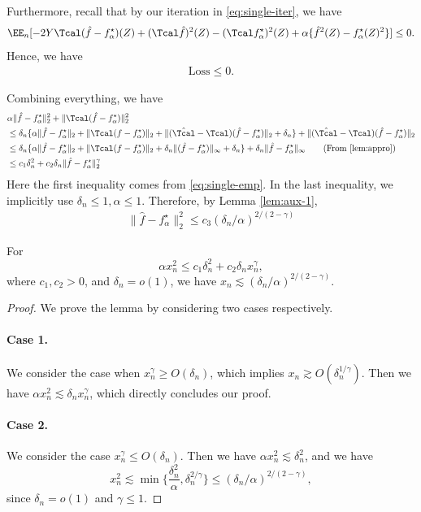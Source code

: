 \documentclass[14pt]{extarticle} %
\begin{document}
Furthermore, recall that by our iteration in \eqref{eq:single-iter}, we have
\begin{align*}
     \EE_n[  - 2 Y  \Tcal (\hat f-f^{\star}_{\alpha})(Z)  + (\Tcal \hat f)^2(Z) - (\Tcal f^{\star}_{\alpha})^2(Z)+ \alpha\{\hat f^2(Z)- f^{\star}_{\alpha}(Z)^2 \} ]\leq 0. 
\end{align*}
Hence, we have 
\begin{align}\label{eq:single-loss}
    \mathrm{Loss}\leq 0. 
\end{align}

Combining everything, we have 
\begin{align*}
    &\alpha \|\hat f - f^{\star}_{\alpha} \|^2_2 + \|\Tcal(\hat f-f^{\star}_{\alpha})\|^2_2 \\
    & \leq \delta_n\{ \alpha \|\hat f-f^{\star}_{\alpha}\|_2 + \|\Tcal(f-f^{\star}_{\alpha})\|_2 +  \|(\hat \Tcal-\Tcal)(\hat f-f^{\star}_{\alpha})\|_2+   \delta_n   \}+  \|(\hat \Tcal-\Tcal)(\hat f-f^{\star}_{\alpha})\|_2 \\ 
     & \leq \delta_n\{ \alpha \|\hat f-f^{\star}_{\alpha}\|_{2} + \|\Tcal(f-f^{\star}_{\alpha})\|_2 +   \delta_n \|(\hat f-f^{\star}_{\alpha})\|_{\infty}+   \delta_n   \}+  \delta_n \|\hat f-f^{\star}_{\alpha}\|_{\infty} \tag{From \eqref{lem:appro}} \\
     &\leq c_1 \delta^2_n  + c_2 \delta_n \|\hat f-f^{\star}_{\alpha}\|^{\gamma}_{2} 
\end{align*}
Here the first inequality comes from \eqref{eq:single-emp}. In the last inequality, we implicitly use $\delta_n\leq 1, \alpha \leq 1$. 
Therefore, by Lemma \ref{lem:aux-1},
\begin{align*}
\|\hat f - f^{\star}_{\alpha} \|^2_2 \leq  c_3 (\delta_n/\alpha)^{2/(2-\gamma)} 
\end{align*}

\begin{lemma}\label{lem:aux-1}
    For $$
    \alpha x_n^2 \leq c_1\delta_n^2 + c_2\delta_n x_n^\gamma,
    $$
    where $c_1, c_2>0$, and $\delta_n = o(1)$, we have $x_n \lesssim (\delta_n/\alpha)^{2/(2-\gamma)}$.
\end{lemma}
\begin{proof}
    We prove the lemma by considering two cases respectively. 
    \paragraph{Case 1.}We consider the case when $x_n^\gamma \geq O(\delta_n)$, which implies $x_n \gtrsim  O(\delta_n^{1/\gamma})$. Then we have $\alpha x_n^2 \lesssim \delta_n x_n^\gamma$, which directly concludes our proof.
    \paragraph{Case 2.} We consider the case $x_n^\gamma \leq O(\delta_n)$. Then we have $\alpha x_n^2 \lesssim \delta_n^2$, and we have $$
    x_n^2 \lesssim \min \bigg\{\frac{\delta_n^2}{\alpha}, \delta_n^{2/\gamma} \bigg\}\leq (\delta_n/\alpha)^{2/(2-\gamma)},
    $$
    since $\delta_n = o(1)$ and $\gamma \leq 1$.
\end{proof}
\end{document}
